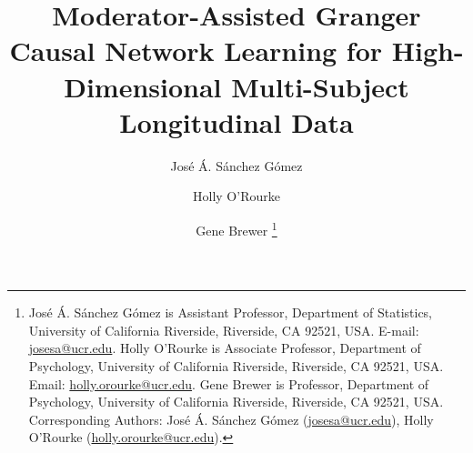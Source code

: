 \documentclass[12pt]{article}
\begin{document}
\def\spacingset#1{\renewcommand{\baselinestretch}
{#1}\small\normalsize} \spacingset{1}



{
	\title{\bf Moderator-Assisted Granger Causal Network Learning for High-Dimensional Multi-Subject Longitudinal Data}
	\author{
		José Á. Sánchez Gómez \and  Holly O'Rourke \and  Gene Brewer \thanks{ José Á. Sánchez Gómez is Assistant Professor, Department of Statistics, University of California Riverside, Riverside, CA 92521, USA. E-mail: \href{mailto:josesa@ucr.edu}{josesa@ucr.edu}. Holly O'Rourke is Associate Professor, Department of Psychology, University of California Riverside, Riverside, CA 92521, USA. Email: \href{mailto:holly.orourke@ucr.edu}{holly.orourke@ucr.edu}. Gene Brewer is Professor, Department of Psychology, University of California Riverside, Riverside, CA 92521, USA.\\
		Corresponding Authors: José Á. Sánchez Gómez (\href{mailto:josesa@ucr.edu}{josesa@ucr.edu}), Holly O'Rourke (\href{mailto:holly.orourke@ucr.edu}{holly.orourke@ucr.edu}).}
	}
	\date{}
	\maketitle
}
\end{document}
